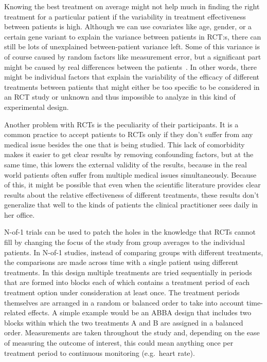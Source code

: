 \documentclass[12pt,a4paper,leqno]{report}
\theoremstyle{plain}
\theoremstyle{definition}
\theoremstyle{remark}
\begin{document}
Knowing the best treatment on average might not help much in finding the right
treatment for a particular patient if the variability in treatment effectiveness
between patients is high. Although we can use covariates like age, gender, or
a certain gene variant to explain the variance between patients in RCT:s, there
can still be lots of unexplained between-patient variance left. Some
of this variance is of course caused by random factors like measurement error,
but a significant part might be caused by real differences between the patients\ \cite{HTE1, HTE2, HTE3, HTE4}.
In other words, there might be individual factors that explain the variability
of the efficacy of different treatments between patients that might either be
too specific to be considered in an RCT study or unknown and thus impossible to
analyze in this kind of experimental design.

Another problem with RCTs is the peculiarity of their participants. It is
a common practice to accept patients to RCTs only if they don't suffer from any
medical issue besides the one that is being studied. This lack of comorbidity
makes it easier to get clear results by removing confounding factors, but at the
same time, this lowers the external validity of the results, because in the real
world patients often suffer from multiple medical issues simultaneously. Because of this, it might be possible that even when the scientific
literature provides clear results about the relative effectiveness of different
treatments, these results don't generalize that well to the kinds of
patients the clinical practitioner sees daily in her office.\ \cite{HTE1}

N-of-1 trials can be used to patch the holes in the knowledge that RCTs cannot
fill by changing the focus of the study from group averages to the individual
patients. In N-of-1 studies, instead of comparing groups with different treatments,
the comparisons are made across time with a single patient using different
treatments. In this design multiple treatments are tried sequentially in periods
that are formed into blocks each of which contains a treatment period of each
treatment option under consideration at least once. The treatment periods themselves are
arranged in a random or balanced order to take
into account time-related effects. A simple example would be an ABBA design that
includes two blocks within which the two treatments A and B are assigned in a
balanced order. Measurements are taken throughout the study and, depending on the
ease of measuring the outcome of interest, this could mean anything
once per treatment period to continuous monitoring (e.g.\ heart rate).
\end{document}
